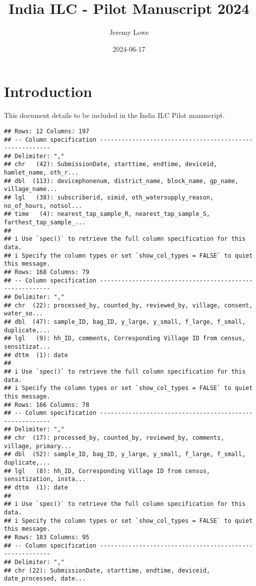 \documentclass[
]{article}
\title{India ILC - Pilot Manuscript 2024}
\author{Jeremy Lowe}
\date{2024-06-17}
\begin{document}
\maketitle

\hypertarget{introduction}{%
\section{Introduction}\label{introduction}}

This document details to be included in the India ILC Pilot manuscript.

\begin{verbatim}
## Rows: 12 Columns: 197
## -- Column specification --------------------------------------------------------
## Delimiter: ","
## chr   (42): SubmissionDate, starttime, endtime, deviceid, hamlet_name, oth_r...
## dbl  (113): devicephonenum, district_name, block_name, gp_name, village_name...
## lgl   (38): subscriberid, simid, oth_watersupply_reason, no_of_hours, notsol...
## time   (4): nearest_tap_sample_R, nearest_tap_sample_S, farthest_tap_sample_...
## 
## i Use `spec()` to retrieve the full column specification for this data.
## i Specify the column types or set `show_col_types = FALSE` to quiet this message.
## Rows: 168 Columns: 79
## -- Column specification --------------------------------------------------------
## Delimiter: ","
## chr  (22): processed_by, counted_by, reviewed_by, village, consent, water_so...
## dbl  (47): sample_ID, bag_ID, y_large, y_small, f_large, f_small, duplicate,...
## lgl   (9): hh_ID, comments, Corresponding Village ID from census, sensitizat...
## dttm  (1): date
## 
## i Use `spec()` to retrieve the full column specification for this data.
## i Specify the column types or set `show_col_types = FALSE` to quiet this message.
## Rows: 166 Columns: 78
## -- Column specification --------------------------------------------------------
## Delimiter: ","
## chr  (17): processed_by, counted_by, reviewed_by, comments, village, primary...
## dbl  (52): sample_ID, bag_ID, y_large, y_small, f_large, f_small, duplicate,...
## lgl   (8): hh_ID, Corresponding Village ID from census, sensitization, insta...
## dttm  (1): date
## 
## i Use `spec()` to retrieve the full column specification for this data.
## i Specify the column types or set `show_col_types = FALSE` to quiet this message.
## Rows: 183 Columns: 95
## -- Column specification --------------------------------------------------------
## Delimiter: ","
## chr (22): SubmissionDate, starttime, endtime, deviceid, date_processed, date...

\end{verbatim}
\end{document}

